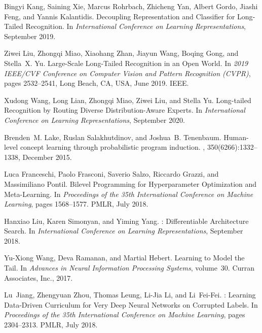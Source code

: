 \documentclass{article}
\begin{document}
\begin{thebibliography}{10}
  Bingyi Kang, Saining Xie, Marcus Rohrbach, Zhicheng Yan, Albert Gordo, Jiashi
    Feng, and Yannis Kalantidis.
  \newblock Decoupling {{Representation}} and {{Classifier}} for
    {{Long}}-{{Tailed Recognition}}.
  \newblock In {\em International {{Conference}} on {{Learning
    Representations}}}, September 2019.
  
  Ziwei Liu, Zhongqi Miao, Xiaohang Zhan, Jiayun Wang, Boqing Gong, and Stella~X.
    Yu.
  \newblock Large-{{Scale Long}}-{{Tailed Recognition}} in an {{Open World}}.
  \newblock In {\em 2019 {{IEEE}}/{{CVF Conference}} on {{Computer Vision}} and
    {{Pattern Recognition}} ({{CVPR}})}, pages 2532--2541, {Long Beach, CA, USA},
    June 2019. {IEEE}.
  
  Xudong Wang, Long Lian, Zhongqi Miao, Ziwei Liu, and Stella Yu.
  \newblock Long-tailed {{Recognition}} by {{Routing Diverse
    Distribution}}-{{Aware Experts}}.
  \newblock In {\em International {{Conference}} on {{Learning
    Representations}}}, September 2020.
  
  Brenden~M. Lake, Ruslan Salakhutdinov, and Joshua~B. Tenenbaum.
  \newblock Human-level concept learning through probabilistic program induction.
  , 350(6266):1332--1338, December 2015.
  
  Luca Franceschi, Paolo Frasconi, Saverio Salzo, Riccardo Grazzi, and
    Massimiliano Pontil.
  \newblock Bilevel {{Programming}} for {{Hyperparameter Optimization}} and
    {{Meta}}-{{Learning}}.
  \newblock In {\em Proceedings of the 35th {{International Conference}} on
    {{Machine Learning}}}, pages 1568--1577. {PMLR}, July 2018.
  
  Hanxiao Liu, Karen Simonyan, and Yiming Yang.
  : Differentiable {{Architecture Search}}.
  \newblock In {\em International {{Conference}} on {{Learning
    Representations}}}, September 2018.
  
  Yu-Xiong Wang, Deva Ramanan, and Martial Hebert.
  \newblock Learning to {{Model}} the {{Tail}}.
  \newblock In {\em Advances in {{Neural Information Processing Systems}}},
    volume~30. {Curran Associates, Inc.}, 2017.
  
  Lu~Jiang, Zhengyuan Zhou, Thomas Leung, Li-Jia Li, and Li~{Fei-Fei}.
  : Learning {{Data}}-{{Driven Curriculum}} for {{Very
    Deep Neural Networks}} on {{Corrupted Labels}}.
  \newblock In {\em Proceedings of the 35th {{International Conference}} on
    {{Machine Learning}}}, pages 2304--2313. {PMLR}, July 2018.
  

\end{thebibliography}
\end{document}
